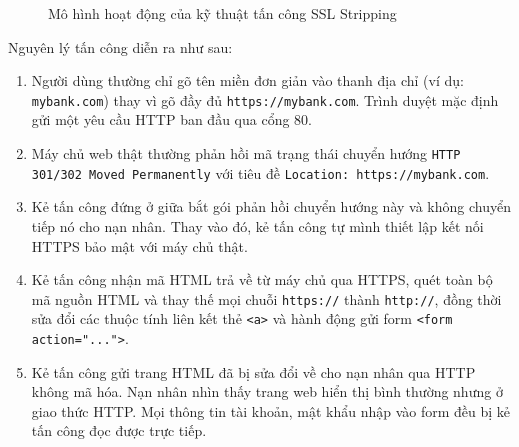 \begin{figure}[htbp]
  \centering
  \caption{Mô hình hoạt động của kỹ thuật tấn công SSL Stripping}
  \label{fig:ssl-strip-concept}
\end{figure}

Nguyên lý tấn công diễn ra như sau:
\begin{enumerate}
  \item Người dùng thường chỉ gõ tên miền đơn giản vào thanh địa chỉ (ví dụ: \texttt{mybank.com}) thay vì gõ đầy đủ \texttt{https://mybank.com}. Trình duyệt mặc định gửi một yêu cầu HTTP ban đầu qua cổng 80.
  \item Máy chủ web thật thường phản hồi mã trạng thái chuyển hướng \texttt{HTTP 301/302 Moved Permanently} với tiêu đề \texttt{Location: https://mybank.com}.
  \item Kẻ tấn công đứng ở giữa bắt gói phản hồi chuyển hướng này và không chuyển tiếp nó cho nạn nhân. Thay vào đó, kẻ tấn công tự mình thiết lập kết nối HTTPS bảo mật với máy chủ thật.
  \item Kẻ tấn công nhận mã HTML trả về từ máy chủ qua HTTPS, quét toàn bộ mã nguồn HTML và thay thế mọi chuỗi \texttt{https://} thành \texttt{http://}, đồng thời sửa đổi các thuộc tính liên kết thẻ \texttt{<a>} và hành động gửi form \texttt{<form action="...">}.
  \item Kẻ tấn công gửi trang HTML đã bị sửa đổi về cho nạn nhân qua HTTP không mã hóa. Nạn nhân nhìn thấy trang web hiển thị bình thường nhưng ở giao thức HTTP. Mọi thông tin tài khoản, mật khẩu nhập vào form đều bị kẻ tấn công đọc được trực tiếp.
\end{enumerate}

